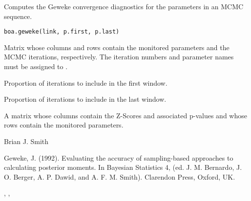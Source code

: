 \begin{Description}\relax
Computes the Geweke convergence diagnostics for the parameters in an MCMC
sequence.
\end{Description}
\begin{Usage}
\begin{verbatim}
boa.geweke(link, p.first, p.last)
\end{verbatim}
\end{Usage}
\begin{Arguments}
\begin{ldescription}
\item[\code{link}] Matrix whose columns and rows contain the monitored parameters
and the MCMC iterations, respectively. The iteration numbers and parameter
names must be assigned to .
\item[\code{p.first}] Proportion of iterations to include in the first window.
\item[\code{p.last}] Proportion of iterations to include in the last window.
\end{ldescription}
\end{Arguments}
\begin{Value}
A matrix whose columns contain the Z-Scores and associated p-values and whose
rows contain the monitored parameters.
\end{Value}
\begin{Author}\relax
Brian J. Smith
\end{Author}
\begin{References}\relax
Geweke, J. (1992). Evaluating the accuracy of sampling-based
approaches to calculating posterior moments. In Bayesian Statistics 4, (ed. J.
M. Bernardo, J. O. Berger, A. P. Dawid, and A. F. M. Smith). Clarendon Press,
Oxford, UK.
\end{References}
\begin{SeeAlso}\relax
{}, ,
\end{SeeAlso}

